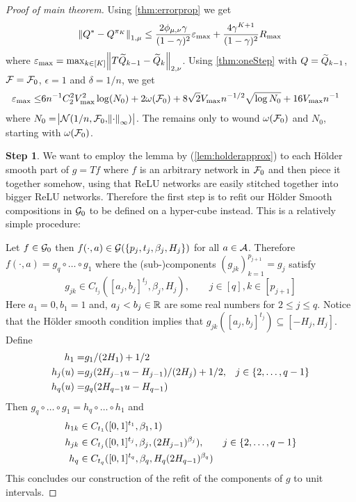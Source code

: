 
\begin{proof}[Proof of main theorem] %
  Using \cref{thm:errorprop} we get
  \begin{equation}
    \norm{Q^* - Q^{\pi_K}}_{1,\mu} \leq
    \frac{2 \phi_{\mu, \nu} \gamma}{(1-\gamma)^2}\varepsilon_{\max} +
    \frac{4 \gamma^{K+1}}{(1-\gamma)^2} R_{\max}
    \label{eq:mp1}
  \end{equation}
  where $\varepsilon_{\max} =
  \max_{k \in [K]} \norm{T \widetilde{Q}_{k-1} - \widetilde{Q}_k}_{2, \nu}$.
  Using \cref{thm:oneStep} with $Q = \widetilde{Q}_{k-1}$,
  $\mathcal{F} = \mathcal{F}_0$, $\epsilon = 1$ and $\delta = 1/n$, we get
  \begin{align}
    \varepsilon_{\max} \leq & 6 n^{-1} C_2^2 V_{\max}^2 \log(N_0)
    + 2 \omega(\mathcal{F}_0)
    + 8 \sqrt{2} V_{\max} n^{-1/2} \sqrt{\log N_0}
    + 16 V_{\max} n^{-1}
    \label{eq:mp2}
  \end{align}
  where $N_0 = \abs{\mathcal{N}(1/n, \mathcal{F}_0, \norm{\cdot}_\infty)}$.
  The remains only to wound $\omega(\mathcal{F}_0)$ and $N_0$,
  starting with $\omega(\mathcal{F}_0)$.

  \textbf{Step 1}. %
  We want to employ the lemma by 
  (\cref{lem:holderapprox})
  to each Hölder smooth part of $g = Tf$ where $f$ is an arbitrary network
  in $\mathcal{F}_0$
  and then piece it together somehow,
  using that ReLU networks are easily stitched together into bigger
  ReLU networks.
  Therefore the first step is to refit our
  Hölder Smooth compositions in $\mathcal{G}_0$ to be defined on a hyper-cube instead.
  This is a relatively simple procedure:

  Let $f \in \mathcal{G}_0$ then $f(\cdot, a) \in
  \mathcal{G}(\{p_j, t_j, \beta_j, H_j\})$ for all $a \in \mathcal{A}$.
  Therefore $f(\cdot, a) = g_q \circ \dots \circ g_1$ where
  the (sub-)components $(g_{jk})_{k=1}^{p_{j+1}} = g_j$ satisfy
  \begin{equation}
    g_{jk} \in C_{t_j}([a_j, b_j]^{t_j}, \beta_j, H_j)
    , \qquad j \in [q], k \in [p_{j+1}]
  \end{equation}
  Here $a_1 = 0, b_1=1$ and,
  $a_j < b_j \in \mathbb{R}$ are some real numbers for $2 \leq j \leq q$.
  Notice that the Hölder smooth condition implies that
  $g_{jk}([a_j, b_j]^{t_j}) \subseteq [-H_j, H_j]$.
  Define
  \begin{align}
    h_1 = & g_1/(2H_1) + 1/2 \notag
    \\ h_j(u) = & g_j(2H_{j-1} u - H_{j-1})/(2H_j) + 1/2,
    & j \in \{2, \dots, q-1\} \notag
    \\ h_q(u) = & g_q(2H_{q-1}u - H_{q-1})
  \end{align}
  Then $g_q \circ \dots \circ g_1 = h_q \circ \dots \circ h_1$ and
  \begin{align}
    h_{1k} \in &\; C_{t_1}([0,1]^{t_1}, \beta_1, 1) \notag
    \\ h_{jk} \in &\; C_{t_j}([0,1]^{t_j}, \beta_j, (2H_{j-1})^{\beta_j}),
    & j \in \{2, \dots, q-1\} \notag
    \\ h_q \in &\; C_{t_q}([0,1]^{t_q}, \beta_q, H_q(2H_{q-1})^{\beta_q})
  \end{align}
  This concludes our construction of the refit of the components of $g$
  to unit intervals.


\end{proof}
